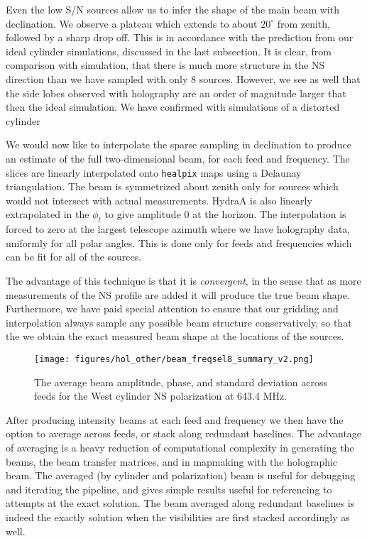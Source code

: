 Even the low S/N sources allow us to infer the shape of the main beam with declination. We observe a plateau which extends to about $20^{\circ}$ from zenith, followed by a sharp drop off. This is in accordance with the prediction from our ideal cylinder simulations, discussed in the last subsection. It is clear, from comparison with simulation, that there is much more structure in the NS direction than we have sampled with only 8 sources. However, we see as well that the side lobes observed with holography are an order of magnitude larger that then the ideal simulation. We have confirmed with simulations of a distorted cylinder 

We would now like to interpolate the sparse sampling in declination to produce an estimate of the full two-dimensional beam, for each feed and frequency. The slices are linearly interpolated onto \texttt{healpix} maps using a Delaunay triangulation. The beam is symmetrized about zenith only for sources which would not intersect with actual measurements. HydraA is also linearly extrapolated in the $\phi_t$ to give amplitude 0 at the horizon. The interpolation is forced to zero at the largest telescope azimuth where we have holography data, uniformly for all polar angles. This is done only for feeds and frequencies which can be fit for all of the sources.

The advantage of this technique is that it is \textit{convergent}, in the sense that as more measurements of the NS profile are added it will produce the true beam shape. Furthermore, we have paid special attention to ensure that our gridding and interpolation always sample any possible beam structure conservatively, so that the we obtain the exact measured beam shape at the locations of the sources.

\begin{figure}[h!]
\begin{center}
\texttt{[image: figures/hol\_other/beam\_freqsel8\_summary\_v2.png]}
\caption{The average beam amplitude, phase, and standard deviation across feeds for the West cylinder NS polarization at 643.4 MHz.\label{example}}
\end{center}
\end{figure}

After producing intensity beams at each feed and frequency we then have the option to average across feeds, or stack along redundant baselines. The advantage of averaging is a heavy reduction of computational complexity in generating the beams, the beam transfer matrices, and in mapmaking with the holographic beam. The averaged (by cylinder and polarization) beam is useful for debugging and iterating the pipeline, and gives simple results useful for referencing to attempts at the exact solution. The beam averaged along redundant baselines is indeed the exactly solution when the visibilities are first stacked accordingly as well.

